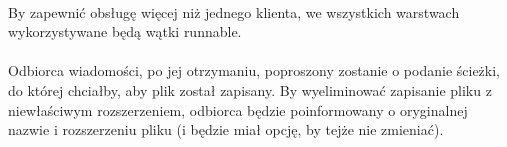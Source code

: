 \documentclass[13p, a4paper, oneside]{article}
\begin{document}
\paragraph{}By zapewnić obsługę więcej niż jednego klienta, we wszystkich warstwach wykorzystywane będą wątki runnable.
\paragraph{}Odbiorca wiadomości, po jej otrzymaniu, poproszony zostanie o podanie ścieżki, do której chciałby, aby plik został zapisany. By wyeliminować zapisanie pliku z niewłaściwym rozszerzeniem, odbiorca będzie poinformowany o oryginalnej nazwie i rozszerzeniu pliku (i będzie miał opcję, by tejże nie zmieniać).
\end{document}
